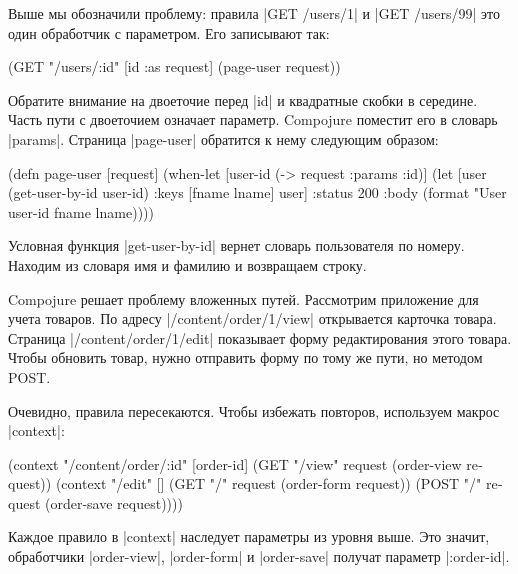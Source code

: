 Выше мы обозначили проблему: правила \spverb|GET /users/1|
и \spverb|GET /users/99| это один обработчик с параметром. Его записывают так:

\begin{english}
  \begin{clojure}
(GET "/users/:id" [id :as request] (page-user request))
  \end{clojure}
\end{english}

Обратите внимание на двоеточие перед \spverb|id| и квадратные скобки в середине.
Часть пути с двоеточием означает параметр. Compojure поместит его в словарь
\spverb|params|. Страница \spverb|page-user| обратится к нему следующим образом:

\begin{english}
  \begin{clojure}
(defn page-user [request]
  (when-let [user-id (-> request :params :id)]
    (let [user (get-user-by-id user-id)
          {:keys [fname lname]} user]
      {:status 200
       :body (format "User %
                     user-id fname lname)})))
  \end{clojure}
\end{english}

Условная функция \spverb|get-user-by-id| вернет словарь пользователя по
номеру. Находим из словаря имя и фамилию и возвращаем строку.

Compojure решает проблему вложенных путей. Рассмотрим приложение для учета
товаров. По адресу \spverb|/content/order/1/view| открывается карточка
товара. Страница \spverb|/content/order/1/edit| показывает форму редактирования
этого товара. Чтобы обновить товар, нужно отправить форму по тому же пути, но
методом POST.

Очевидно, правила пересекаются. Чтобы избежать повторов, используем макрос
\spverb|context|:

\begin{english}
  \begin{clojure}
(context "/content/order/:id" [order-id]
  (GET  "/view" request (order-view request))
  (context "/edit" []
    (GET  "/" request (order-form request))
    (POST "/" request (order-save request))))
  \end{clojure}
\end{english}

Каждое правило в \spverb|context| наследует параметры из уровня выше. Это
значит, обработчики \spverb|order-view|, \spverb|order-form| и
\spverb|order-save| получат параметр \spverb|:order-id|.

